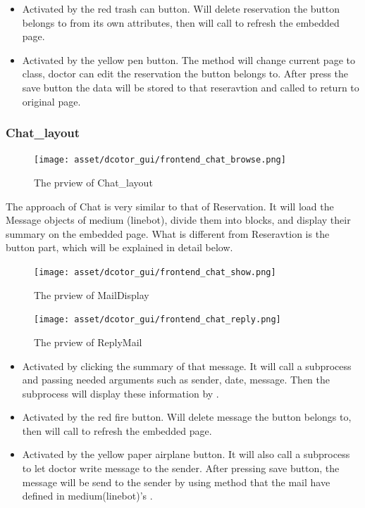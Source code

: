 \documentclass{article}
\begin{document}
\begin{itemize}
  \item {} Activated by the red trash can button. Will delete reservation the button belongs to from its own attributes, then will call  to refresh the embedded page.
  \item {} Activated by the yellow pen button. The method will change current page to  class, doctor can edit the reservation the button belongs to. After press the save button the data will be stored to that reseravtion and called  to return to original page.
\end{itemize}

\subsubsection*{Chat_layout}
\begin{figure}[h]
  \centering
  \texttt{[image: asset/dcotor\_gui/frontend\_chat\_browse.png]}
  \caption{The prview of Chat_layout}
  \label{fig:frontend_chat_browse}
\end{figure}
The approach of Chat is very similar to that of Reservation. It will load the Message objects of medium (linebot), divide them into blocks, and display their summary on the embedded page. What is different from Reseravtion is the button part, which will be explained in detail below.

\begin{figure}[h]
  \centering
  \texttt{[image: asset/dcotor\_gui/frontend\_chat\_show.png]}
  \caption{The prview of MailDisplay}
  \label{fig:frontend_chat_show}
\end{figure}
\begin{figure}[h]
  \centering
  \texttt{[image: asset/dcotor\_gui/frontend\_chat\_reply.png]}
  \caption{The prview of ReplyMail}
  \label{fig:frontend_chat_reply}
\end{figure}

\begin{itemize}
  \item {} Activated by clicking the summary of that message. It will call a subprocess and passing needed arguments such as sender, date, message. Then the subprocess will display these information by .
  \item {} Activated by the red fire button. Will delete message the button belongs to, then will call  to refresh the embedded page.
  \item {} Activated by the yellow paper airplane button. It will also call a subprocess to let doctor write message to the sender. After pressing save button, the message will be send to the sender by using  method that the mail have defined in medium(linebot)'s .
\end{itemize}
\end{document}
